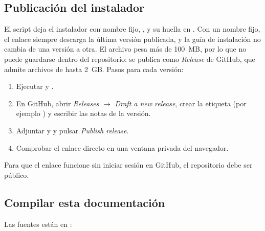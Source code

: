 \subsection{Publicación del instalador}

El script deja el instalador con nombre fijo, , y su huella en
. Con un nombre fijo, el enlace
\ruta{\enlacedescarga} siempre descarga la última versión publicada, y la guía de instalación no cambia de una versión a
otra. El archivo pesa más de 100~MB, por lo que no puede guardarse dentro del repositorio: se publica como
\emph{Release} de GitHub, que admite archivos de hasta 2~GB. Pasos para cada versión:

\begin{enumerate}
	\item Ejecutar  y .
	\item En GitHub, abrir \textit{Releases} $\rightarrow$ \textit{Draft a new release}, crear la etiqueta
	       (por ejemplo ) y escribir las notas de la versión.
	\item Adjuntar  y  y pulsar
	      \textit{Publish release}.
	\item Comprobar el enlace directo en una ventana privada del navegador.
\end{enumerate}

Para que el enlace funcione sin iniciar sesión en GitHub, el repositorio debe ser público.

\subsection{Compilar esta documentación}

Las fuentes están en :

